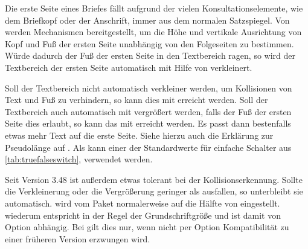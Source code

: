 \begin{Declaration}
\end{Declaration}
\begin{Explain}
  Die erste Seite eines Briefes fällt %
  \iftrue %
    aufgrund der vielen Konsultationselemente, wie dem Briefkopf oder der
    Anschrift,
  \fi %
  immer aus dem normalen Satzspiegel. Von \KOMAScript{} werden Mechanismen
  bereitgestellt, um die Höhe und vertikale Ausrichtung von Kopf und Fuß der
  ersten Seite unabhängig von den Folgeseiten zu bestimmen. Würde dadurch der
  Fuß der ersten Seite in den Textbereich ragen, so wird
  der Textbereich der ersten Seite automatisch mit Hilfe von
   verkleinert. 
\end{Explain}
Soll der
Textbereich nicht automatisch verkleiner werden, um Kollisionen von Text und
Fuß zu verhindern, so kann dies mit %
 erreicht werden. Soll der
Textbereich auch automatisch mit  vergrößert werden,
falls der Fuß der ersten Seite dies erlaubt, so kann das mit
%
 erreicht werden. Es passt
dann bestenfalls etwas mehr Text auf die erste Seite.  Siehe hierzu auch die
Erklärung zur Pseudolänge  auf
. Als  kann
einer der Standardwerte für einfache Schalter aus
\autoref{tab:truefalseswitch},  verwendet
werden.

Seit Version 3.48
ist \KOMAScript{} außerdem etwas tolerant bei der Kollisionserkennung. Sollte
die Verkleinerung oder die Vergrößerung geringer als 
ausfallen, so unterbleibt sie automatisch.  wird vom Paket
 normalerweise auf die Hälfte von 
eingestellt.  wiederum entspricht in der Regel der
Grundschriftgröße und ist damit von Option
 abhängig. Bei  gilt dies
nur, wenn nicht per Option 
Kompatibilität zu einer früheren Version erzwungen wird.%
\EndIndexGroup


